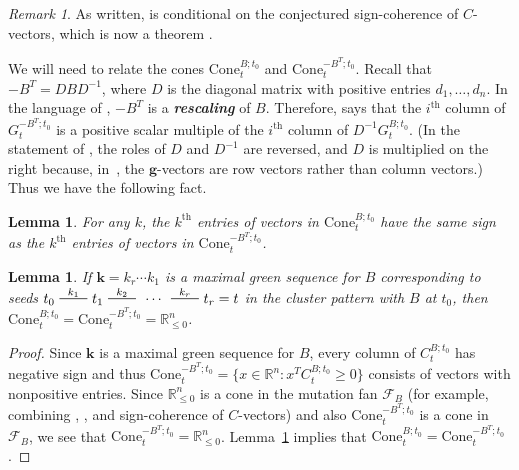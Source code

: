 \documentclass{amsart}
\newtheorem{lemma}[proposition]{Lemma}
\theoremstyle{definition}
\theoremstyle{remark}
\newtheorem{remark}[proposition]{Remark}
\numberwithin{equation}{section}
\newcommand{\newword}[1]{\textbf{\emph{#1}}}
\newcommand{\reals}{\mathbb R}
\newcommand{\edge}{\,\,\rule[2.7pt]{20pt}{0.5pt}\,\,}
\newcommand{\set}[1]{{\lbrace #1 \rbrace}}
\newcommand{\F}{{\mathcal F}}
\renewcommand{\th}{^\text{th}}
\newcommand{\0}{{\mathbf{0}}}
\newcommand{\Cone}{\mathrm{Cone}}
\newcommand{\g}{\mathbf{g}}
\newcommand{\kk}{{\boldsymbol{k}}}
\renewcommand{\th}{^\text{th}}
\newcommand{\symmetrizer}{{D}}
\begin{document}
\begin{remark}\label{conditional}
As written, \cite[Proposition~8.13]{universal} is conditional on the conjectured sign-coherence of $C$-vectors, which is now a theorem \cite[Corollary~5.5]{GHKK}.
\end{remark}

We will need to relate the cones $\Cone^{B;t_0}_t$ and $\Cone^{-B^T;t_0}_t$.
Recall that $-B^T=\symmetrizer B\symmetrizer^{-1}$, where $\symmetrizer$ is the diagonal matrix with positive entries $d_1,\ldots,d_n$.
In the language of \cite[Section~7]{universal}, $-B^T$ is a \newword{rescaling} of $B$.
Therefore, \cite[Proposition~8.20]{universal} says that the $i\th$ column of $G_t^{-B^T;t_0}$ is a positive scalar multiple of the $i\th$ column of $\symmetrizer^{-1}G_t^{B;t_0}$.
(In the statement of \cite[Proposition~8.20]{universal}, the roles of $\symmetrizer$ and $\symmetrizer^{-1}$ are reversed, and $\symmetrizer$ is multiplied on the right because, in~\cite{universal}, the $\g$-vectors are row vectors rather than column vectors.)
Thus we have the following fact.
\begin{lemma}\label{B or -BT}
For any $k$, the $k\th$ entries of vectors in $\Cone^{B;t_0}_t$ have the same sign as the $k\th$ entries of vectors in $\Cone^{-B^T;t_0}_t$.
\end{lemma}

\begin{lemma}\label{max green neg cone}
If $\kk=k_r\cdots k_1$ is a maximal green sequence for $B$ corresponding to seeds $t_0\overset{k_1}{\edge}t_1\overset{k_2}{\edge}\,\cdots\,\overset{k_r}{\edge}t_r=t$ in the cluster pattern with $B$ at $t_0$, then ${\Cone_t^{B;t_0}=\Cone_t^{-B^T;t_0}=\reals_{\le0}^n}$.
\end{lemma}
\begin{proof}
Since $\kk$ is a maximal green sequence for $B$, every column of $C_t^{B;t_0}$ has negative sign and thus $\Cone_t^{-B^T;t_0}=\set{x\in\reals^n:x^TC_t^{B;t_0}\ge0}$ consists of vectors with nonpositive entries.
Since $\reals_{\le0}^n$ is a cone in the mutation fan $\F_B$ (for example, combining \mbox{\cite[Proposition~7.1]{universal}}, \mbox{\cite[Proposition~8.9]{universal}}, and sign-coherence of $C$-vectors) and also $\Cone_t^{-B^T;t_0}$ is a cone in $\F_B$, we see that $\Cone_t^{-B^T;t_0}=\reals_{\le0}^n$.
Lemma~\ref{B or -BT} implies that $\Cone_t^{B;t_0}=\Cone_t^{-B^T;t_0}$.
\end{proof}
\end{document}

